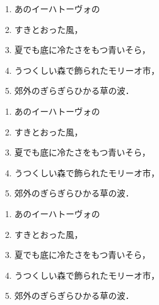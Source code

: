 \documentclass[a4paper, papersize, twocolumn, dvipdfmx, deluxe]{jsarticle}
\begin{document}
\begin{enumerate}[label=\KHiroha*]
  \item あのイーハトーヴォの
  \item すきとおった風，
  \item 夏でも底に冷たさをもつ青いそら，
  \item うつくしい森で飾られたモリーオ市，
  \item 郊外のぎらぎらひかる草の波．
\end{enumerate}

\begin{enumerate}[label=\Carabic*]
  \item あのイーハトーヴォの
  \item すきとおった風，
  \item 夏でも底に冷たさをもつ青いそら，
  \item うつくしい森で飾られたモリーオ市，
  \item 郊外のぎらぎらひかる草の波．
\end{enumerate}

\setcounter{Wmonth}{2}
\setcounter{Wday}{15}
\intercalarytrue
\begin{enumerate}[label=\Wdate*]
  \item あのイーハトーヴォの
  \item すきとおった風，
  \item 夏でも底に冷たさをもつ青いそら，
  \item うつくしい森で飾られたモリーオ市，
  \item 郊外のぎらぎらひかる草の波．
\end{enumerate}
\end{document}
